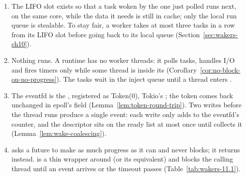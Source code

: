 \begin{Answer}
    \begin{enumerate}
        \item The LIFO slot exists so that a task woken by the one just polled runs next, on the same core, while the data it needs is still in cache; only the local run queue is stealable. To stay fair, a worker takes at most three tasks in a row from its LIFO slot before going back to its local queue (Section~\ref{sec:wakers-ch10}).
        \item Nothing runs. A  runtime has no worker threads: it polls tasks, handles I/O and fires timers only while some thread is inside its  (Corollary~\ref{cor:no-block-on-no-progress}). The tasks wait in the inject queue until a thread enters .
        \item The eventfd is the , registered as Token(0), Tokio's ; the token comes back unchanged in epoll's  field (Lemma~\ref{lem:token-round-trip}). Two writes before the thread runs produce a single event: each write only adds to the eventfd's counter, and the descriptor sits on the ready list at most once until  collects it (Lemma~\ref{lem:wake-coalescing}).
        \item {} asks a future to make as much progress as it can and never blocks; it returns  instead.  is a thin wrapper around  (or its equivalent) and blocks the calling thread until an event arrives or the timeout passes (Table~\ref{tab:wakers-11.1}).
    \end{enumerate}
\end{Answer}
